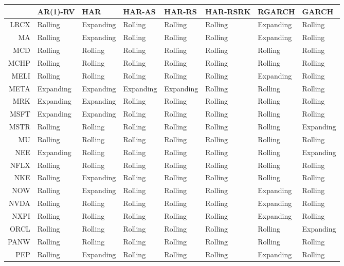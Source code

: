 \begin{table}[ht]
\centering
\begin{tabular}{rlllllll}
  \hline
 & AR(1)-RV & HAR & HAR-AS & HAR-RS & HAR-RSRK & RGARCH & GARCH \\ 
  \hline
LRCX & Rolling & Expanding & Rolling & Rolling & Rolling & Expanding & Rolling \\ 
  MA & Rolling & Expanding & Rolling & Rolling & Rolling & Expanding & Rolling \\ 
  MCD & Rolling & Rolling & Rolling & Rolling & Rolling & Rolling & Rolling \\ 
  MCHP & Rolling & Rolling & Rolling & Rolling & Rolling & Rolling & Rolling \\ 
  MELI & Rolling & Rolling & Rolling & Rolling & Rolling & Expanding & Rolling \\ 
  META & Expanding & Expanding & Expanding & Expanding & Rolling & Rolling & Rolling \\ 
  MRK & Expanding & Expanding & Rolling & Rolling & Rolling & Rolling & Rolling \\ 
  MSFT & Expanding & Expanding & Rolling & Rolling & Rolling & Rolling & Rolling \\ 
  MSTR & Rolling & Rolling & Rolling & Rolling & Rolling & Rolling & Expanding \\ 
  MU & Rolling & Rolling & Rolling & Rolling & Rolling & Rolling & Rolling \\ 
  NEE & Expanding & Rolling & Rolling & Rolling & Rolling & Rolling & Expanding \\ 
  NFLX & Rolling & Rolling & Rolling & Rolling & Rolling & Rolling & Rolling \\ 
  NKE & Rolling & Expanding & Rolling & Rolling & Rolling & Rolling & Rolling \\ 
  NOW & Rolling & Expanding & Rolling & Rolling & Rolling & Expanding & Rolling \\ 
  NVDA & Rolling & Rolling & Rolling & Rolling & Rolling & Expanding & Rolling \\ 
  NXPI & Rolling & Rolling & Rolling & Rolling & Rolling & Expanding & Rolling \\ 
  ORCL & Rolling & Rolling & Rolling & Rolling & Rolling & Rolling & Expanding \\ 
  PANW & Rolling & Rolling & Rolling & Rolling & Rolling & Rolling & Rolling \\ 
  PEP & Rolling & Expanding & Rolling & Rolling & Rolling & Expanding & Rolling \\ 

\end{tabular}
\end{table}
